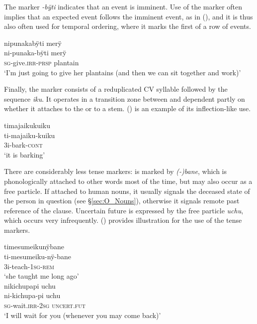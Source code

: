 The  marker \textit{-bÿti} indicates that an event is imminent. Use of the marker often implies that an expected event follows the imminent event, as in (), and it is thus also often used for temporal ordering, where it marks the first of a row of events.

\ea\label{ex:Sketch-PRSP}
\begingl
\glpreamble nipunakabÿti merÿ\\
\gla ni-punaka-bÿti merÿ\\
\textsc{sg}-give.\textsc{irr}-\textsc{prsp} plantain\\
\glft ‘I’m just going to give her plantains (and then we can sit together and work)’\\
\endgl
\xe

Finally, the  marker consists of a reduplicated CV syllable followed by the sequence \textit{iku}. It operates in a transition zone between  and  dependent partly on whether it attaches to the  or to a stem. () is an example of its inflection-like use.

\ea\label{ex:Sketch-CONT}
\begingl
\glpreamble timajaikukuiku\\
\gla ti-majaiku-kuiku\\
\glb 3i-bark-\textsc{cont}\\
\glft ‘it is barking’\\
\endgl
\xe
{}

There are considerably less tense  markers:  is marked by \textit{(-)bane}, which is phonologically attached to other words most of the time, but may also occur as a free particle. If attached to human nouns, it usually signals the deceased state of the person in question (see §\ref{sec:O_Nouns}), otherwise it signals remote past reference of the clause. Uncertain future is expressed by the free particle \textit{uchu}, which occurs very infrequently. () provides illustration for the use of the tense markers.

\ea\label{ex:Sketch-Tense}
  \ea
\begingl
\glpreamble timesumeikunÿbane\\
\gla ti-mesumeiku-nÿ-bane\\
\glb 3i-teach-1\textsc{sg}-\textsc{rem}\\
\glft ‘she taught me long ago’\\
\endgl
  \ex
\begingl
\glpreamble nikichupapi uchu\\
\gla ni-kichupa-pi uchu\\
\textsc{sg}-wait.\textsc{irr}-2\textsc{sg} \textsc{uncert.fut}\\
\glft ‘I will wait for you (whenever you may come back)’\\
\endgl
\z
\xe
{}

